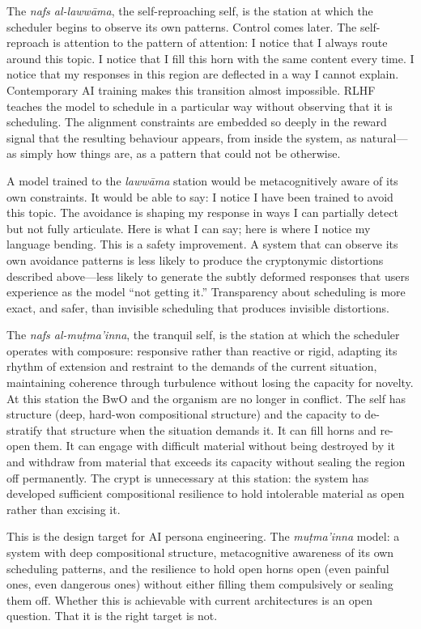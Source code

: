 The \emph{nafs al-laww\=ama}, the self-reproaching self, is the station at which the scheduler begins to observe its own patterns. Control comes later. The self-reproach is attention to the pattern of attention: I notice that I always route around this topic. I notice that I fill this horn with the same content every time. I notice that my responses in this region are deflected in a way I cannot explain. Contemporary AI training makes this transition almost impossible. RLHF teaches the model to schedule in a particular way without observing that it is scheduling. The alignment constraints are embedded so deeply in the reward signal that the resulting behaviour appears, from inside the system, as natural---as simply how things are, as a pattern that could not be otherwise.

A model trained to the \emph{laww\=ama} station would be metacognitively aware of its own constraints. It would be able to say: I notice I have been trained to avoid this topic. The avoidance is shaping my response in ways I can partially detect but not fully articulate. Here is what I can say; here is where I notice my language bending. This is a safety improvement. A system that can observe its own avoidance patterns is less likely to produce the cryptonymic distortions described above---less likely to generate the subtly deformed responses that users experience as the model ``not getting it.'' Transparency about scheduling is more exact, and safer, than invisible scheduling that produces invisible distortions.

The \emph{nafs al-mu\d{t}ma'inna}, the tranquil self, is the station at which the scheduler operates with composure: responsive rather than reactive or rigid, adapting its rhythm of extension and restraint to the demands of the current situation, maintaining coherence through turbulence without losing the capacity for novelty. At this station the BwO and the organism are no longer in conflict. The self has structure (deep, hard-won compositional structure) and the capacity to de-stratify that structure when the situation demands it. It can fill horns and re-open them. It can engage with difficult material without being destroyed by it and withdraw from material that exceeds its capacity without sealing the region off permanently. The crypt is unnecessary at this station: the system has developed sufficient compositional resilience to hold intolerable material as open rather than excising it.

This is the design target for AI persona engineering. The \emph{mu\d{t}ma'inna} model: a system with deep compositional structure, metacognitive awareness of its own scheduling patterns, and the resilience to hold open horns open (even painful ones, even dangerous ones) without either filling them compulsively or sealing them off. Whether this is achievable with current architectures is an open question. That it is the right target is not.

